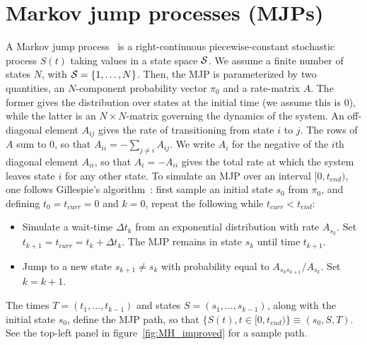\section{Markov jump processes (MJPs)} 
\label{sec:mjp}
A Markov jump process~\citep{Cinlar1975} is a right-continuous piecewise-constant stochastic process $S(t)$ taking values in a state space ${\mathcal S}$. %
We assume a finite number of states $N$, with ${\mathcal S} = \{1,\ldots,N\}$. 
Then, the MJP is parameterized by two quantities, an $N$-component probability vector $\pi_0$ and a rate-matrix $A$. 
The former gives the distribution over states at the initial time (we assume this is $0$), while the latter is an $N \times N$-matrix governing the dynamics of the system.  
An off-diagonal element $A_{ij}$ gives the rate of transitioning from state $i$ to $j$. 
The rows of $A$ sum to $0$, so that $A_{ii}=-\sum_{j \neq i} A_{ij}  $. 
We write $A_i$ for the negative of the $i$th diagonal element $A_{ii}$, so that $A_i = -A_{ii}$ gives the total rate at which the system leaves state $i$ for any other state.
To simulate an MJP over an interval $[0,t_{end})$, one follows Gillespie's algorithm~\citep{gillespie97}: 
first sample an initial state $s_0$ from $\pi_0$, and defining $t_0 = t_{curr} = 0$ and $k = 0$, repeat the following while $t_{curr} < t_{end}$:
\begin{itemize}
  \item Simulate a wait-time $\Delta t_k$ from an exponential distribution with rate $A_{s_k}$.  
    Set $t_{k+1} = t_{curr} = t_{k} + \Delta t_k$. 
    The MJP remains in state $s_k$ until time $t_{k+1}$.
  \item Jump to a new state $s_{k+1} \neq s_k$ with probability equal to $A_{s_ks_{k+1}}/A_{s_k}$. Set $k=k+1$.
\end{itemize}
The times $T=(t_1, \dotsc, t_{k - 1})$ and states $S=(s_1, \dotsc, s_{k - 1 })$, along with the initial state $s_0$, define the MJP path, so that $\{S(t), t \in [0,t_{end})\} \equiv (s_0, S,T)$. 
See the top-left panel in figure~\ref{fig:MH_improved} for a sample path.

\vspace{-.15in}
